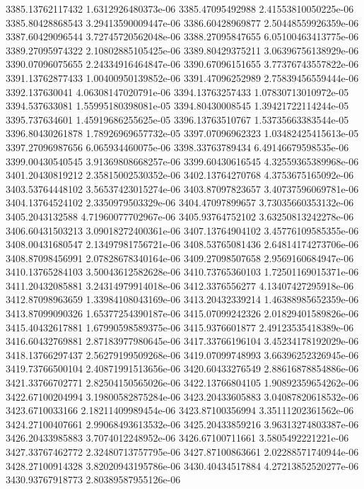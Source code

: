 {3385.13762117432 1.6312926480373e-06
3385.47095492988 2.41553810050225e-06
3385.80428868543 3.29413590009447e-06
3386.60428969877 2.50448559926359e-06
3387.60429096544 3.72745720562048e-06
3388.27095847655 6.05100463413775e-06
3389.27095974322 2.10802885105425e-06
3389.80429375211 3.06396756138929e-06
3390.07096075655 2.24334916464847e-06
3390.67096151655 3.77376743557822e-06
3391.13762877433 1.00400950139852e-06
3391.47096252989 2.75839456559444e-06
3392.137630041 4.06308147020791e-06
3394.13763257433 1.07830713010972e-05
3394.537633081 1.55995180398081e-05
3394.80430008545 1.39421722114244e-05
3395.737634601 1.45919686255625e-05
3396.13763510767 1.53735663383544e-05
3396.80430261878 1.78926969657732e-05
3397.07096962323 1.03482425415613e-05
3397.27096987656 6.065934460075e-06
3398.33763789434 6.49146679598535e-06
3399.00430540545 3.91369808668257e-06
3399.60430616545 4.32559365389968e-06
3401.20430819212 2.35815002530352e-06
3402.13764270768 4.3753675165092e-06
3403.53764448102 3.56537423015274e-06
3403.87097823657 3.40737596069781e-06
3404.13764524102 2.3350979503329e-06
3404.47097899657 3.73035660353132e-06
3405.2043132588 4.71960077702967e-06
3405.93764752102 3.63250813242278e-06
3406.60431503213 3.09018272400361e-06
3407.13764904102 3.45776109585355e-06
3408.00431680547 2.13497981756721e-06
3408.53765081436 2.64814174273706e-06
3408.87098456991 2.07828678340164e-06
3409.27098507658 2.9569160684947e-06
3410.13765284103 3.50043612582628e-06
3410.73765360103 1.72501169015371e-06
3411.20432085881 3.24314979914018e-06
3412.3376556277 4.13407427295918e-06
3412.87098963659 1.33984108043169e-06
3413.20432339214 1.46388985652359e-06
3413.87099090326 1.65377254390187e-06
3415.07099242326 2.01829401589826e-06
3415.40432617881 1.67990598589375e-06
3415.9376601877 2.49123535418389e-06
3416.60432769881 2.87183977980645e-06
3417.33766196104 3.45234178192029e-06
3418.13766297437 2.56279199509268e-06
3419.07099748993 3.66396252326945e-06
3419.73766500104 2.40871991513656e-06
3420.60433276549 2.88616878854886e-06
3421.33766702771 2.82504150565026e-06
3422.13766804105 1.90892359654262e-06
3422.67100204994 3.19800582875284e-06
3423.20433605883 3.04087820618532e-06
3423.6710033166 2.18211409989454e-06
3423.87100356994 3.35111202361562e-06
3424.27100407661 2.99068493613532e-06
3425.20433859216 3.96313274803387e-06
3426.20433985883 3.7074012248952e-06
3426.67100711661 3.5805492221221e-06
3427.33767462772 2.32480713757795e-06
3427.87100863661 2.02288571740944e-06
3428.27100914328 3.82020943195786e-06
3430.40434517884 4.27213852520277e-06
3430.93767918773 2.80389587955126e-06
}
